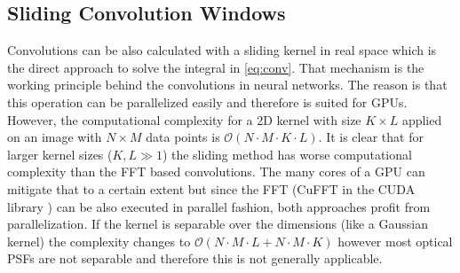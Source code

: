 \documentclass{juliacon}
\begin{document}
\subsection{Sliding Convolution Windows}
Convolutions can be also calculated with a sliding kernel in real space which is the direct approach to
solve the integral in \autoref{eq:conv}.
That mechanism is the working principle
behind the convolutions in neural networks. The reason is that this operation can be parallelized easily and therefore 
is suited for GPUs. However, the computational complexity for a 2D kernel with size $K \times L$ applied on an image with
$N \times M$ data points is $\mathcal O(N \cdot M \cdot K \cdot L)$. It is clear that for larger kernel sizes ($K,L \gg 1$) the sliding method 
has worse computational complexity than the FFT based convolutions. The many cores of a GPU can mitigate that to a certain extent
but since the FFT (CuFFT in the CUDA library \cite{CUDA}) can be also executed in parallel fashion, both approaches profit from parallelization.
If the kernel is separable over the dimensions (like a Gaussian kernel) the complexity changes to $\mathcal O(N \cdot M \cdot L +  N \cdot M \cdot K)$ however most optical PSFs are not separable and therefore this is not generally applicable. 
\end{document}
